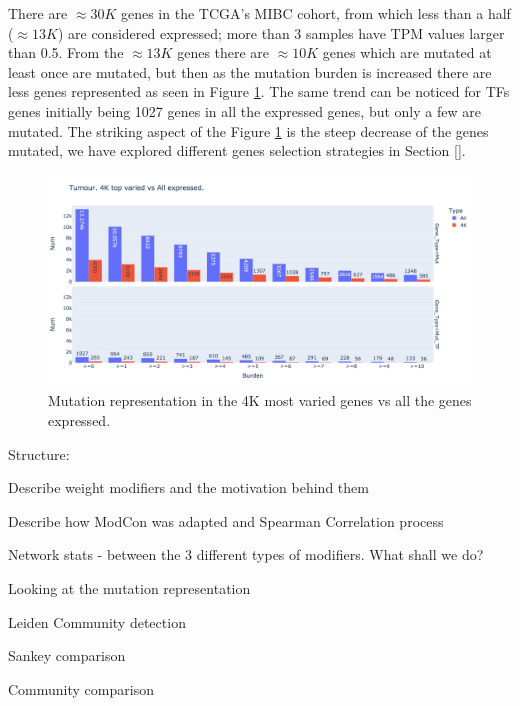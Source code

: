 There are $\approx30K$ genes in the TCGA's MIBC cohort, from which less than a half ($\approx13K$) are considered expressed; more than 3 samples have TPM values larger than 0.5. From the $\approx13K$ genes there are $\approx10K$ genes which are mutated at least once are mutated, but then as the mutation burden is increased there are less genes represented as seen in Figure \ref{fig:N_I:mut_rep_tum}. The same trend can be noticed for TFs genes initially being 1027 genes in all the expressed genes, but only a few are mutated. The striking aspect of the Figure \ref{fig:N_I:mut_rep_tum} is the steep decrease of the genes mutated, we have explored different genes selection strategies in Section \ref{}.

\begin{figure}[!htb]    \centering\includegraphics[width=1.0\textwidth,height=0.6\textheight,keepaspectratio]{Sections/Network_I/Resources/Tum_network/MutTF_representation_4K-all.png}
    \caption{Mutation representation in the 4K most varied genes vs all the genes expressed.}
    \label{fig:N_I:mut_rep_tum}
\end{figure}


\newpage

Structure:
\begin{todolist}
    \item [\done] Describe weight modifiers and the motivation behind them
    \item [\done] Describe how ModCon was adapted and Spearman Correlation process 
    \item [\done] Network stats - between the 3 different types of modifiers. What shall we do?
    \item Looking at the mutation representation 
    \item Leiden Community detection
    \item Sankey comparison
    \item Community comparison 
\end{todolist}


